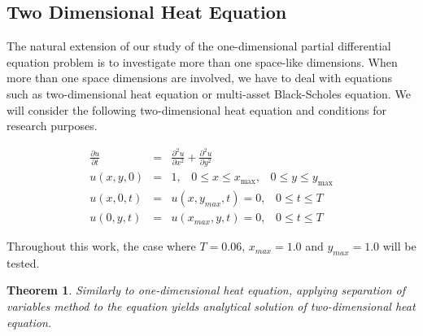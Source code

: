 \documentclass[12pt, oneside]{book}
\theoremstyle{plain}
\newtheorem{theorem}{Theorem}[section]
\theoremstyle{definition}
\begin{document}
\subsection{Two Dimensional Heat Equation}
The natural extension of our study of the one-dimensional partial differential equation problem is to investigate more than one space-like dimensions. When more than one space dimensions are involved, we have to deal with equations such as two-dimensional heat equation or multi-asset Black-Scholes equation.  We will consider the following two-dimensional heat equation and conditions for research purposes.

\begin{eqnarray} \label{HeatTwoBase}
\frac{\partial u}{\partial t} &=& \frac{\partial^2 u}{\partial x^2} +\frac{\partial^2 u}{\partial y^2} \\[10pt]
u(x,y,0) &=& 1, \hspace{10pt} 0 \leq x \leq x_{\max}, \hspace{10pt} 0 \leq y \leq y_{\max} \\[10pt]
u(x, 0, t) &=& u(x, y_{max}, t) = 0, \hspace{10pt} 0 \leq t \leq T \\[10pt]
u(0, y, t) &=& u(x_{max}, y, t) = 0 , \hspace{10pt} 0 \leq t \leq T
\end{eqnarray}

Throughout this work, the case where $T = 0.06$, $x_{max} = 1.0$ and $y_{max} = 1.0$ will be tested.


\begin{theorem} \label{heat2Anal}
Similarly to one-dimensional heat equation, applying separation of variables method to the equation yields analytical solution of two-dimensional heat equation.
\end{theorem} 
\end{document}
